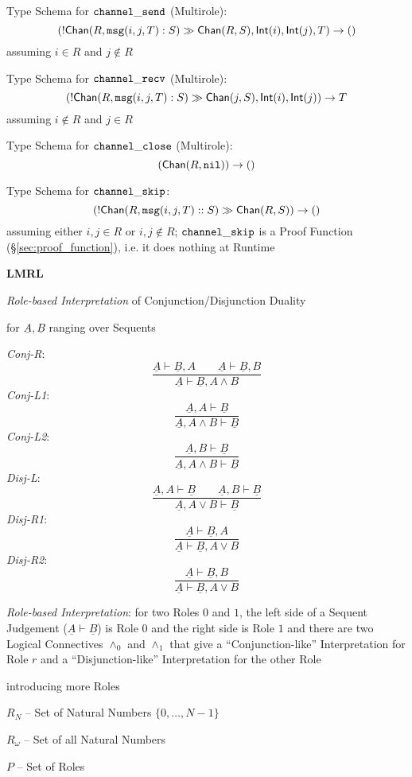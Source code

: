 Type Schema for $\mathtt{channel\_send}$ (Multirole):
\[
  (!\mathsf{Chan} (R, \mathtt{msg}(i,j,T):S) \gg \mathsf{Chan}(R,S), \mathsf{Int}(i), \mathsf{Int}(j), T)
    \rightarrow \mathsf{()}
\]
assuming $i \in R$ and $j \notin R$

Type Schema for $\mathtt{channel\_recv}$ (Multirole):
\[
  (!\mathsf{Chan} (R, \mathtt{msg}(i,j,T):S) \gg \mathsf{Chan}(j,S), \mathsf{Int}(i), \mathsf{Int}(j))
    \rightarrow T
\]
assuming $i \notin R$ and $j \in R$

Type Schema for $\mathtt{channel\_close}$ (Multirole):
\[
  (\mathsf{Chan}(R, \mathtt{nil})) \rightarrow \mathsf{()}
\]

Type Schema for $\mathtt{channel\_skip}$:
\[
  (!\mathsf{Chan}(R,\mathtt{msg}(i,j,T)::S) \gg \mathsf{Chan}(R,S)) \rightarrow \mathsf{()}
\]
assuming either $i,j \in R$ or $i,j \notin R$; $\mathtt{channel\_skip}$ is a
Proof Function (\S\ref{sec:proof_function}), i.e. it does nothing at
Runtime


\textbf{LMRL}

\emph{Role-based Interpretation} of Conjunction/Disjunction Duality

for $\underline{A},\underline{B}$ ranging over Sequents

\emph{Conj-R}:
\[
  \frac {\underline{A} \vdash \underline{B},A \quad\quad
    \underline{A} \vdash \underline{B},B}
  {\underline{A} \vdash \underline{B},A \wedge B}
\]
\emph{Conj-L1}:
\[
  \frac {\underline{A},A \vdash \underline{B}}
  {\underline{A},A \wedge B \vdash \underline{B}}
\]
\emph{Conj-L2}:
\[
  \frac {\underline{A},B \vdash \underline{B}}
  {\underline{A},A \wedge B \vdash \underline{B}}
\]
\emph{Disj-L}:
\[
  \frac {\underline{A},A \vdash \underline{B} \quad\quad
    \underline{A},B \vdash \underline{B}}
  {\underline{A},A \vee B \vdash \underline{B}}
\]
\emph{Disj-R1}:
\[
  \frac {\underline{A} \vdash \underline{B},A}
  {\underline{A} \vdash \underline{B}, A \vee B}
\]
\emph{Disj-R2}:
\[
  \frac {\underline{A} \vdash \underline{B},B}
  {\underline{A} \vdash \underline{B}, A \vee B}
\]

\emph{Role-based Interpretation}: for two Roles $0$ and $1$, the left
side of a Sequent Judgement ($\underline{A} \vdash \underline{B}$) is
Role $0$ and the right side is Role $1$ and there are two Logical
Connectives $\wedge_0$ and $\wedge_1$ that give a ``Conjunction-like''
Interpretation for Role $r$ and a ``Disjunction-like'' Interpretation
for the other Role

introducing more Roles

$R_N$ -- Set of Natural Numbers $\{0,\ldots,N-1\}$

$R_\omega$ -- Set of all Natural Numbers

$P$ -- Set of Roles

